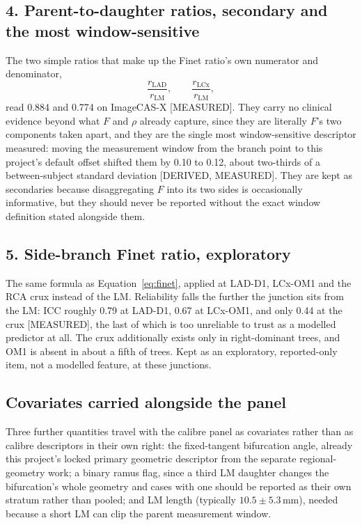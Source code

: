 \documentclass[11pt]{article}
\begin{document}
\subsection*{4. Parent-to-daughter ratios, secondary and the most window-sensitive}

The two simple ratios that make up the Finet ratio's own numerator and denominator,
\begin{equation}
  \frac{r_{\mathrm{LAD}}}{r_{\mathrm{LM}}}, \qquad \frac{r_{\mathrm{LCx}}}{r_{\mathrm{LM}}} ,
  \label{eq:parent-daughter}
\end{equation}
read 0.884 and 0.774 on ImageCAS-X [MEASURED]. They carry no clinical evidence beyond what $F$ and
$\rho$ already capture, since they are literally $F$'s two components taken apart, and they are the
single most window-sensitive descriptor measured: moving the measurement window from the branch
point to this project's default offset shifted them by 0.10 to 0.12, about two-thirds of a
between-subject standard deviation [DERIVED, MEASURED]. They are kept as secondaries because
disaggregating $F$ into its two sides is occasionally informative, but they should never be reported
without the exact window definition stated alongside them.

\subsection*{5. Side-branch Finet ratio, exploratory}

The same formula as Equation~\ref{eq:finet}, applied at LAD-D1, LCx-OM1 and the RCA crux instead of
the LM. Reliability falls the further the junction sits from the LM: ICC roughly 0.79 at LAD-D1,
0.67 at LCx-OM1, and only 0.44 at the crux [MEASURED], the last of which is too unreliable to trust
as a modelled predictor at all. The crux additionally exists only in right-dominant trees, and OM1
is absent in about a fifth of trees. Kept as an exploratory, reported-only item, not a modelled
feature, at these junctions.

\subsection*{Covariates carried alongside the panel}

Three further quantities travel with the calibre panel as covariates rather than as calibre
descriptors in their own right: the fixed-tangent bifurcation angle, already this project's locked
primary geometric descriptor from the separate regional-geometry work; a binary ramus flag, since a
third LM daughter changes the bifurcation's whole geometry and cases with one should be reported as
their own stratum rather than pooled; and LM length (typically $10.5\pm5.3$\,mm), needed because a
short LM can clip the parent measurement window.
\end{document}
